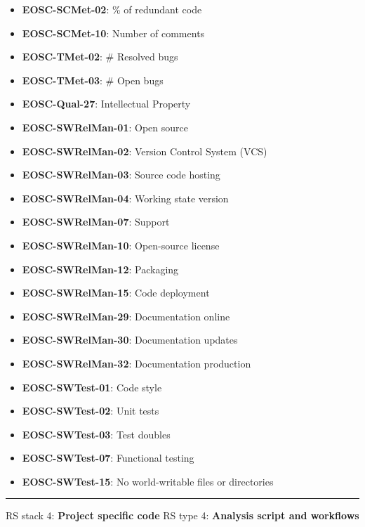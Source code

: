 \begin{itemize}
    \item \textbf{EOSC-SCMet-02}: \% of redundant code
    \item \textbf{EOSC-SCMet-10}: Number of comments
    \item \textbf{EOSC-TMet-02}: \# Resolved bugs
    \item \textbf{EOSC-TMet-03}: \# Open bugs
    \item \textbf{EOSC-Qual-27}: Intellectual Property
    \item \textbf{EOSC-SWRelMan-01}: Open source
    \item \textbf{EOSC-SWRelMan-02}: Version Control System (VCS)
    \item \textbf{EOSC-SWRelMan-03}: Source code hosting
    \item \textbf{EOSC-SWRelMan-04}: Working state version
    \item \textbf{EOSC-SWRelMan-07}: Support
    \item \textbf{EOSC-SWRelMan-10}: Open-source license
    \item \textbf{EOSC-SWRelMan-12}: Packaging
    \item \textbf{EOSC-SWRelMan-15}: Code deployment
    \item \textbf{EOSC-SWRelMan-29}: Documentation online
    \item \textbf{EOSC-SWRelMan-30}: Documentation updates
    \item \textbf{EOSC-SWRelMan-32}: Documentation production
    \item \textbf{EOSC-SWTest-01}: Code style
    \item \textbf{EOSC-SWTest-02}: Unit tests
    \item \textbf{EOSC-SWTest-03}: Test doubles
    \item \textbf{EOSC-SWTest-07}: Functional testing
    \item \textbf{EOSC-SWTest-15}: No world-writable files or directories
\end{itemize}
\hrule

RS stack 4: \textbf{Project specific code} \newline
RS type 4: \textbf{Analysis script and workflows}

